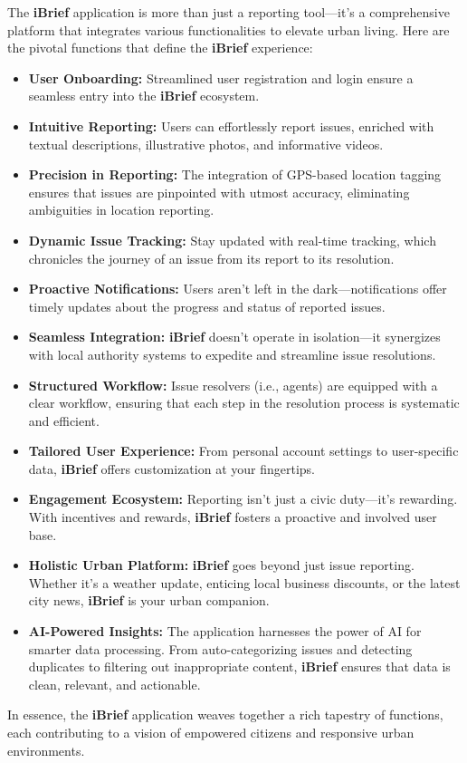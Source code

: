 The \textbf{iBrief} application is more than just a reporting tool—it's a comprehensive platform that integrates various functionalities to elevate urban living. Here are the pivotal functions that define the \textbf{iBrief} experience:

\begin{itemize}
    \item \textbf{User Onboarding:} Streamlined user registration and login ensure a seamless entry into the \textbf{iBrief} ecosystem.
    
    \item \textbf{Intuitive Reporting:} Users can effortlessly report issues, enriched with textual descriptions, illustrative photos, and informative videos.
    
    \item \textbf{Precision in Reporting:} The integration of GPS-based location tagging ensures that issues are pinpointed with utmost accuracy, eliminating ambiguities in location reporting.
    
    \item \textbf{Dynamic Issue Tracking:} Stay updated with real-time tracking, which chronicles the journey of an issue from its report to its resolution.
    
    \item \textbf{Proactive Notifications:} Users aren't left in the dark—notifications offer timely updates about the progress and status of reported issues.
    
    \item \textbf{Seamless Integration:} \textbf{iBrief} doesn't operate in isolation—it synergizes with local authority systems to expedite and streamline issue resolutions.
    
    \item \textbf{Structured Workflow:} Issue resolvers (i.e., agents) are equipped with a clear workflow, ensuring that each step in the resolution process is systematic and efficient.
    
    \item \textbf{Tailored User Experience:} From personal account settings to user-specific data, \textbf{iBrief} offers customization at your fingertips.
    
    \item \textbf{Engagement Ecosystem:} Reporting isn't just a civic duty—it's rewarding. With incentives and rewards, \textbf{iBrief} fosters a proactive and involved user base.
    
    \item \textbf{Holistic Urban Platform:} \textbf{iBrief} goes beyond just issue reporting. Whether it's a weather update, enticing local business discounts, or the latest city news, \textbf{iBrief} is your urban companion.
    
    \item \textbf{AI-Powered Insights:} The application harnesses the power of AI for smarter data processing. From auto-categorizing issues and detecting duplicates to filtering out inappropriate content, \textbf{iBrief} ensures that data is clean, relevant, and actionable.
\end{itemize}

In essence, the \textbf{iBrief} application weaves together a rich tapestry of functions, each contributing to a vision of empowered citizens and responsive urban environments.
